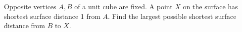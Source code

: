 Opposite vertices $ A,B $ of a unit cube are fixed. A point $ X $ on the surface has shortest surface distance 1 from $ A $. Find the largest possible shortest surface distance from $ B $ to $ X $.
